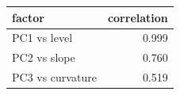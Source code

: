 
\begin{tabular}{lr}
\toprule
factor & correlation\\
\midrule
PC1 vs level & 0.999\\
PC2 vs slope & 0.760\\
PC3 vs curvature & 0.519\\
\bottomrule
\end{tabular}
